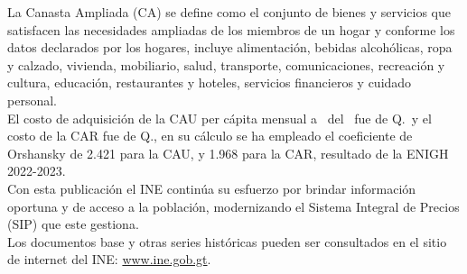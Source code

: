 \documentclass[letterpaper, twoside]{article}
\begin{document}
\newpage

La Canasta Ampliada (CA) se define como el conjunto de bienes y servicios que
satisfacen las necesidades ampliadas de los miembros de un hogar y conforme los
datos declarados por los hogares, incluye alimentación, bebidas alcohólicas,
ropa y calzado, vivienda, mobiliario, salud, transporte, comunicaciones,
recreación y cultura, educación, restaurantes y hoteles, servicios financieros y
cuidado personal. 
\\[\baselineskip]
El costo de adquisición de la CAU per cápita mensual a \mes\ del \anio\ fue de
Q.\CAU\ y el costo de la CAR fue de Q.\CAR, en su cálculo se ha empleado el
coeficiente de Orshansky de 2.421 para la CAU, y 1.968 para la CAR, resultado de
la ENIGH 2022-2023.
\\[\baselineskip]
Con esta publicación el INE continúa su esfuerzo por brindar información
oportuna y de acceso a la población, modernizando el Sistema Integral de Precios
(SIP) que este gestiona. 
\\[\baselineskip]
Los documentos base y otras series históricas pueden ser consultados en el sitio
de internet del INE: \href{http://www.ine.gob.gt}{www.ine.gob.gt}.
\end{document}
